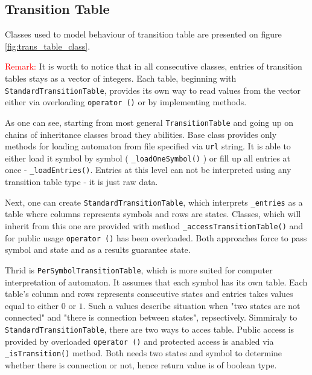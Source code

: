 \documentclass{article}
\begin{document}
%
%
\newpage
\subsection{Transition Table}
Classes used to model behaviour of transition table are presented on figure \ref{fig:trans_table_class}. 

\textcolor{red}{Remark:} It is worth to notice that in all consecutive classes, entries of transition tables stays as a vector of integers. Each table, beginning with \texttt{StandardTransitionTable}, provides its own way to read values from the vector either via overloading \texttt{operator ()} or by implementing methods.

As one can see, starting from most general \texttt{TransitionTable} and going up on chains of inheritance classes broad they abilities. Base class provides only methods for loading automaton from file specified via \texttt{url} string. It is able to either load it symbol by symbol ( \texttt{\_loadOneSymbol()} ) or fill up all entries at once - \texttt{\_loadEntries()}. Entries at this level can not be interpreted using any transition table type - it is just raw data.

Next, one can create \texttt{StandardTransitionTable}, which interprets \texttt{\_entries} as a table where columns represents symbols and rows are states. Classes, which will inherit from this one are provided with method \texttt{\_accessTransitionTable()} and for public usage \texttt{operator ()} has been overloaded. Both approaches force to pass symbol and state and as a results guarantee state. 

Thrid  is \texttt{PerSymbolTransitionTable}, which is more suited for computer interpretation of automaton. It assumes that each symbol has its own table. Each table's column and rows represents consecutive states and entries takes values equal to either $0$ or $1$. Such a values describe situation when "two states are not connected" and "there is connection between states", repsectively. Simmiraly to \texttt{StandardTransitionTable}, there are two ways to acces table. Public access is provided by overloaded \texttt{operator ()} and protected access is anabled via \texttt{\_isTransition()} method. Both needs two states and symbol to determine whether there is connection or not, hence return value is of boolean type.
\end{document}
